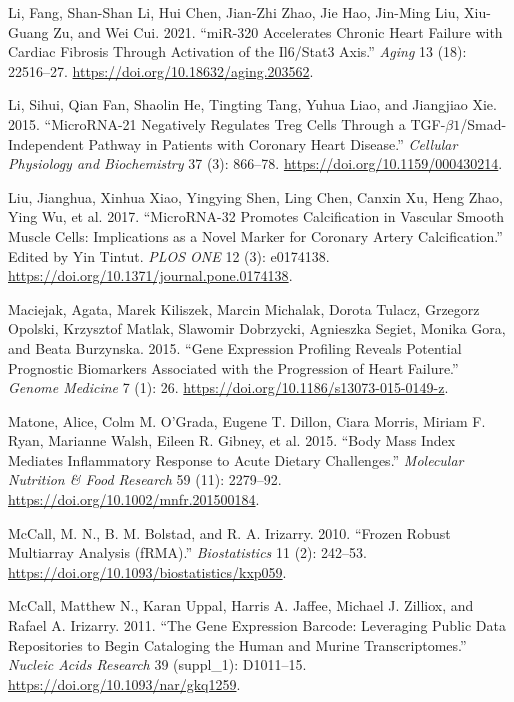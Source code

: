 \documentclass[smallextended]{svjour3}       %
\newlength{\cslhangindent}
\newlength{\cslentryspacingunit} %
\newenvironment{CSLReferences}[2] %
 {%
  \setlength{\parindent}{0pt}
  \ifodd #1
  \let\oldpar\par
  \def\par{\hangindent=\cslhangindent\oldpar}
  \fi
  \setlength{\parskip}{#2\cslentryspacingunit}
 }%
 {}
\begin{document}
\begin{CSLReferences}{1}{0}
\leavevmode{}%
Li, Fang, Shan-Shan Li, Hui Chen, Jian-Zhi Zhao, Jie Hao, Jin-Ming Liu,
Xiu-Guang Zu, and Wei Cui. 2021. {``{miR}-320 Accelerates Chronic Heart
Failure with Cardiac Fibrosis Through Activation of the {Il6}/{Stat3}
Axis.''} \emph{Aging} 13 (18): 22516--27.
\url{https://doi.org/10.18632/aging.203562}.

\leavevmode{}%
Li, Sihui, Qian Fan, Shaolin He, Tingting Tang, Yuhua Liao, and
Jiangjiao Xie. 2015. {``{MicroRNA}-21 {Negatively} {Regulates} {Treg}
{Cells} {Through} a {TGF}-\(\beta1\)/{Smad}-{Independent} {Pathway} in
{Patients} with {Coronary} {Heart} {Disease}.''} \emph{Cellular
Physiology and Biochemistry} 37 (3): 866--78.
\url{https://doi.org/10.1159/000430214}.

\leavevmode{}%
Liu, Jianghua, Xinhua Xiao, Yingying Shen, Ling Chen, Canxin Xu, Heng
Zhao, Ying Wu, et al. 2017. {``{MicroRNA}-32 Promotes Calcification in
Vascular Smooth Muscle Cells: {Implications} as a Novel Marker for
Coronary Artery Calcification.''} Edited by Yin Tintut. \emph{PLOS ONE}
12 (3): e0174138. \url{https://doi.org/10.1371/journal.pone.0174138}.

\leavevmode{}%
Maciejak, Agata, Marek Kiliszek, Marcin Michalak, Dorota Tulacz,
Grzegorz Opolski, Krzysztof Matlak, Slawomir Dobrzycki, Agnieszka
Segiet, Monika Gora, and Beata Burzynska. 2015. {``Gene Expression
Profiling Reveals Potential Prognostic Biomarkers Associated with the
Progression of Heart Failure.''} \emph{Genome Medicine} 7 (1): 26.
\url{https://doi.org/10.1186/s13073-015-0149-z}.

\leavevmode{}%
Matone, Alice, Colm M. O'Grada, Eugene T. Dillon, Ciara Morris, Miriam
F. Ryan, Marianne Walsh, Eileen R. Gibney, et al. 2015. {``Body Mass
Index Mediates Inflammatory Response to Acute Dietary Challenges.''}
\emph{Molecular Nutrition \& Food Research} 59 (11): 2279--92.
\url{https://doi.org/10.1002/mnfr.201500184}.

\leavevmode{}%
McCall, M. N., B. M. Bolstad, and R. A. Irizarry. 2010. {``Frozen Robust
Multiarray Analysis ({fRMA}).''} \emph{Biostatistics} 11 (2): 242--53.
\url{https://doi.org/10.1093/biostatistics/kxp059}.

\leavevmode{}%
McCall, Matthew N., Karan Uppal, Harris A. Jaffee, Michael J. Zilliox,
and Rafael A. Irizarry. 2011. {``The {Gene} {Expression} {Barcode}:
Leveraging Public Data Repositories to Begin Cataloging the Human and
Murine Transcriptomes.''} \emph{Nucleic Acids Research} 39 (suppl\_1):
D1011--15. \url{https://doi.org/10.1093/nar/gkq1259}.


\end{CSLReferences}
\end{document}
